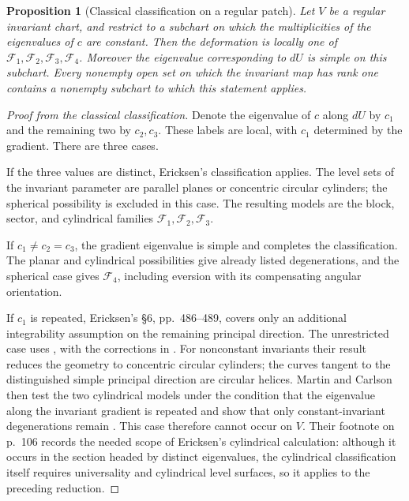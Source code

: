 \documentclass[11pt,a4paper]{article}
\numberwithin{equation}{section}
\theoremstyle{plain}
\newtheorem{proposition}[theorem]{Proposition}
\theoremstyle{definition}
\theoremstyle{remark}
\begin{document}
\begin{proposition}[Classical classification on a regular patch]
\label{completion:regularclassification}
Let $V$ be a regular invariant chart, and restrict to a subchart on
which the multiplicities of the eigenvalues of $c$ are constant.
Then the deformation is locally one of
$\mathcal F_1,\mathcal F_2,\mathcal F_3,\mathcal F_4$.
Moreover the eigenvalue corresponding to $dU$ is simple on this
subchart. Every nonempty open set on which the invariant map has rank
one contains a nonempty subchart to which this statement applies.
\end{proposition}
\begin{proof}[Proof from the classical classification]
Denote the eigenvalue of $c$ along $dU$ by $c_1$ and the remaining
two by $c_2,c_3$. These labels are local, with $c_1$ determined by
the gradient. There are three cases.

If the three values are distinct, Ericksen's classification
\cite[\S4, pp.~476--485]{Ericksen1954} applies. The level sets of the
invariant parameter are parallel planes or concentric circular
cylinders; the spherical possibility is excluded in this case. The
resulting models are the block, sector, and cylindrical families
$\mathcal F_1,\mathcal F_2,\mathcal F_3$.

If $c_1\ne c_2=c_3$, the gradient eigenvalue is simple and
\cite[\S5, pp.~485--486]{Ericksen1954} completes the classification.
The planar and cylindrical possibilities give already listed
degenerations, and the spherical case gives $\mathcal F_4$, including
eversion with its compensating angular orientation.

If $c_1$ is repeated, Ericksen's \S6, pp.~486--489, covers only an
additional integrability assumption on the remaining principal
direction. The unrestricted case uses
\cite[Theorem 1.1, p.~138, proof pp.~154--158]{MarrisShiau1970}, with
the corrections in \cite[p.~406]{MarrisShiauCorr1970}. For nonconstant
invariants their result reduces the geometry to concentric circular
cylinders; the curves tangent to the distinguished simple principal
direction are circular helices. Martin and Carlson then test
the two cylindrical models under the condition that the eigenvalue
along the invariant gradient is repeated
and show that only constant-invariant degenerations remain
\cite[\S3, pp.~107--108]{MartinCarlson1976}. This case therefore
cannot occur on $V$. Their footnote on p.~106 records the needed
scope of Ericksen's cylindrical calculation: although it occurs in
the section headed by distinct eigenvalues, the cylindrical
classification itself requires universality and cylindrical level
surfaces, so it applies to the preceding reduction.


\end{proof}
\end{document}

